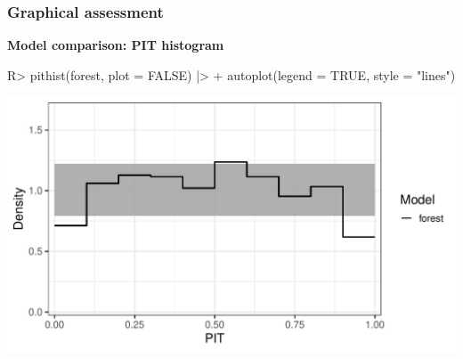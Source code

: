 \documentclass[11pt,t,usepdftitle=false,aspectratio=169]{beamer}
\begin{document}
\begin{frame}[fragile]
\addtocounter{framenumber}{-1}
\frametitle{Graphical assessment}

\vspace{-0.75em}

\textbf{Model comparison: PIT histogram}

\vspace{0.5em}

\begin{Schunk}
\begin{Sinput}
R> pithist(forest, plot = FALSE) |>
+    autoplot(legend = TRUE, style = "lines")
\end{Sinput}
\end{Schunk}

\begin{center}
\includegraphics{slides-rain_topmodels_lm_pithist1_lines}
\end{center}

\end{frame}
\end{document}
